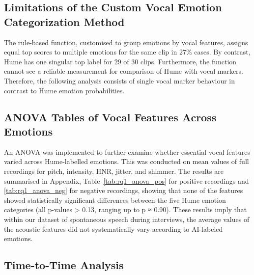 \subsection{Limitations of the Custom Vocal Emotion Categorization Method}

The rule-based function, customised to group emotions by vocal features, assigns equal top scores to multiple emotions for the same clip in 27\% cases.
By contrast, Hume has one singular top label for 29 of 30 clips. Furthermore, the function cannot see a reliable measurement for comparison of Hume with vocal markers. 
Therefore, the following analysis consists of single vocal marker behaviour in contrast to Hume emotion probabilities. 
    

\subsection{ANOVA Tables of Vocal Features Across Emotions}
An ANOVA was implemented to further examine whether essential vocal features varied across Hume-labelled emotions. This was conducted on mean values of full recordings for pitch, intensity, HNR, jitter, and shimmer. 
The results are summarised in Appendix, Table~\ref{tab:rq1_anova_pos} for positive recordings and \ref{tab:rq1_anova_neg} for negative recordings, 
showing that none of the features showed statistically significant differences between the five Hume emotion categories (all p-values > 0.13, ranging up to p ≈ 0.90). 
These results imply that within our dataset of spontaneous speech during interviews, the average values of the acoustic features did not systematically vary according to AI-labeled emotions. 

\subsection{Time-to-Time Analysis}

